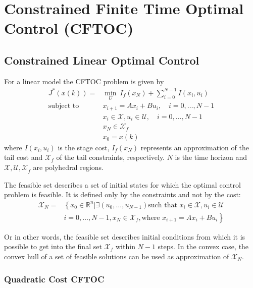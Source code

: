 \section{Constrained Finite Time Optimal Control (CFTOC)}

\subsection{Constrained Linear Optimal Control}

For a linear model the CFTOC problem is given by
\begin{align*}
    J^*(x(k)) =            & \min_U \: I_f(x_N) + \sum_{i=0}^{N-1}I(x_i,u_i)                    \\
    \text{subject to}\quad & x_{i+1} = Ax_i +Bu_i, \quad i = 0, \ldots, N-1                     \\
                           & x_i \in \mathcal{X}, u_i \in \mathcal{U}, \quad i = 0, \ldots, N-1 \\
                           & x_N \in \mathcal{X}_f                                              \\
                           & x_0 = x(k)
\end{align*}
where $I(x_i,u_i)$ is the stage cost, $I_f(x_N)$ represents an approximation of the tail cost and $\mathcal{X}_f$ of the tail constraints, respectively. $N$ is the time horizon and $\mathcal{X,U,X}_f$ are polyhedral regions.

\newpar{}

The feasible set describes a set of initial states for which the optimal control problem is feasible. It is defined only by the constraints and not by the cost:
\begin{align*}
    \mathcal{X}_N = & \left\{ x_0 \in \mathbb{R}^n | \exists\left(u_0, \ldots, u_{N-1}\right) \text{such that } x_i\in\mathcal{X}, u_i\in\mathcal{U} \right. \\
                    & \left.i=0,\ldots, N-1, x_N\in\mathcal{X}_f, \text{where } x_{i+1}=Ax_i + Bu_i\right\}
\end{align*}

Or in other words, the feasible set describes initial conditions from which it is possible to get into the final set $\mathcal{X}_f$ within $N-1$ steps.
\newpar{}
In the convex case, the convex hull of a set of feasible solutions can be used as approximation of $\mathcal{X}_N$.

\subsubsection{Quadratic Cost CFTOC}

